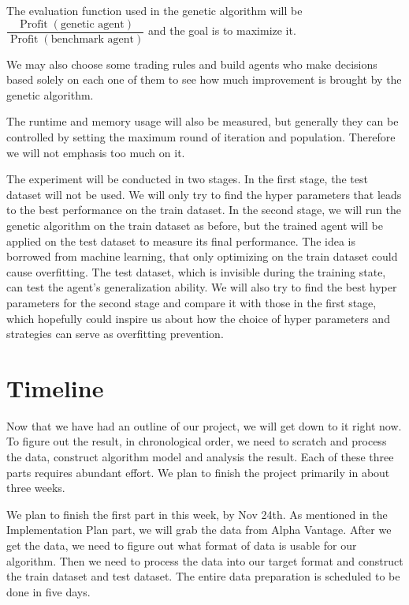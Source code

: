 \documentclass{article}
\begin{document}
The evaluation function used in the genetic algorithm will be
$\dfrac{
		\operatorname{Profit}(\text{genetic agent})
	}{
		\operatorname{Profit}(\text{benchmark agent})
	}$ and the goal is to maximize it.

We may also choose some trading rules and build agents who make decisions based solely
on each one of them to see how much improvement is brought by the genetic algorithm.

The runtime and memory usage will also be measured,
but generally they can be controlled by setting the maximum round of iteration and population.
Therefore we will not emphasis too much on it.


The experiment will be conducted in two stages.
In the first stage, the test dataset will not be used.
We will only try to find the hyper parameters that leads to the best performance on the train dataset.
In the second stage, we will run the genetic algorithm on the train dataset as before,
but the trained agent will be applied on the test dataset to measure its final performance.
The idea is borrowed from machine learning, that only optimizing on the train dataset could cause overfitting.
The test dataset, which is invisible during the training state, can test the agent's generalization ability.
We will also try to find the best hyper parameters for the second stage and compare it with those in the first stage,
which hopefully could inspire us about how the choice of hyper parameters and strategies can serve as overfitting prevention.


\section{Timeline}


Now that we have had an outline of our project, we will get down to it right now.
To figure out the result, in chronological order, we need to scratch and process the data, construct algorithm model and analysis the result.
Each of these three parts requires abundant effort.
We plan to finish the project primarily in about three weeks.

We plan to finish the first part in this week, by Nov 24th.
As mentioned in the Implementation Plan part, we will grab the data from Alpha Vantage.
After we get the data, we need to figure out what format of data is usable for our algorithm.
Then we need to process the data into our target format and construct the train dataset and test dataset. 
The entire data preparation is scheduled to be done in five days.
\end{document}
